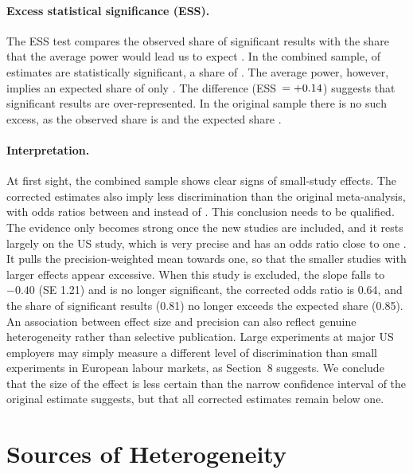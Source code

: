 \documentclass[11pt,a4paper]{article}
\begin{document}
\paragraph{Excess statistical significance (ESS).}
The ESS test compares the observed share of significant results with the
share that the average power would lead us to expect \citep{askarov2024}.
In the combined sample, \maNsigComb{} of \maKcomb{} estimates are
statistically significant, a share of \maShareSigComb. The average power,
however, implies an expected share of only \maExpSigComb. The difference
(ESS~$= +0.14$) suggests that significant results are
over-represented. In the original sample there is no such excess, as the
observed share is \maShareSig{} and the expected share \maExpSig.

\paragraph{Interpretation.}
At first sight, the combined sample shows clear signs of small-study
effects. The corrected estimates also imply less discrimination than the
original meta-analysis, with odds ratios between \maORwaapComb{} and
\maORpetComb{} instead of \maORre. This conclusion needs to be qualified.
The evidence only becomes strong once the new studies are included, and it
rests largely on the US study, which is very precise and has an odds ratio
close to one \citep{kline2022}. It pulls the precision-weighted mean
towards one, so that the smaller studies with larger effects appear
excessive. When this study is excluded, the slope falls to $-0.40$
(SE 1.21) and is no longer significant, the corrected odds ratio is 0.64,
and the share of significant results (0.81) no longer exceeds the expected
share (0.85).
An association between effect size and precision can also reflect genuine
heterogeneity rather than selective publication. Large experiments at major
US employers may simply measure a different level of discrimination than
small experiments in European labour markets, as Section~8 suggests. We
conclude that the size of the effect is less certain than the narrow
confidence interval of the original estimate suggests, but that all
corrected estimates remain below one.
\newpage
\section{Sources of Heterogeneity}
\end{document}
